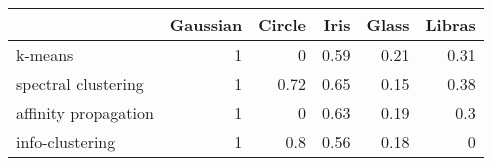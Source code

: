 \begin{tabular}{lrrrrr}
\hline
                      &   Gaussian &   Circle &   Iris &   Glass &   Libras \\
\hline
 k-means              &          1 &     0    &   0.59 &    0.21 &     0.31 \\
 spectral clustering  &          1 &     0.72 &   0.65 &    0.15 &     0.38 \\
 affinity propagation &          1 &     0    &   0.63 &    0.19 &     0.3  \\
 info-clustering      &          1 &     0.8  &   0.56 &    0.18 &     0    \\
\hline
\end{tabular}